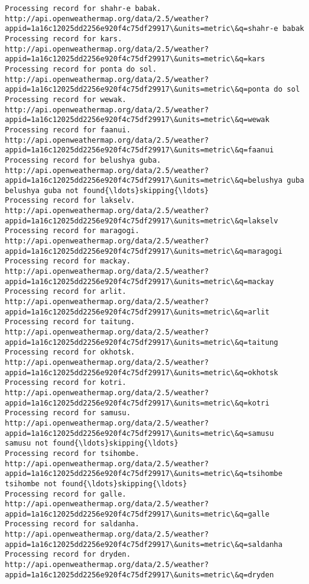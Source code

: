 \documentclass[11pt]{article}
\begin{document}
\begin{Verbatim}[commandchars=\\\{\}]
Processing record for shahr-e babak.
http://api.openweathermap.org/data/2.5/weather?appid=1a16c12025dd2256e920f4c75df29917\&units=metric\&q=shahr-e babak
Processing record for kars.
http://api.openweathermap.org/data/2.5/weather?appid=1a16c12025dd2256e920f4c75df29917\&units=metric\&q=kars
Processing record for ponta do sol.
http://api.openweathermap.org/data/2.5/weather?appid=1a16c12025dd2256e920f4c75df29917\&units=metric\&q=ponta do sol
Processing record for wewak.
http://api.openweathermap.org/data/2.5/weather?appid=1a16c12025dd2256e920f4c75df29917\&units=metric\&q=wewak
Processing record for faanui.
http://api.openweathermap.org/data/2.5/weather?appid=1a16c12025dd2256e920f4c75df29917\&units=metric\&q=faanui
Processing record for belushya guba.
http://api.openweathermap.org/data/2.5/weather?appid=1a16c12025dd2256e920f4c75df29917\&units=metric\&q=belushya guba
belushya guba not found{\ldots}skipping{\ldots}
Processing record for lakselv.
http://api.openweathermap.org/data/2.5/weather?appid=1a16c12025dd2256e920f4c75df29917\&units=metric\&q=lakselv
Processing record for maragogi.
http://api.openweathermap.org/data/2.5/weather?appid=1a16c12025dd2256e920f4c75df29917\&units=metric\&q=maragogi
Processing record for mackay.
http://api.openweathermap.org/data/2.5/weather?appid=1a16c12025dd2256e920f4c75df29917\&units=metric\&q=mackay
Processing record for arlit.
http://api.openweathermap.org/data/2.5/weather?appid=1a16c12025dd2256e920f4c75df29917\&units=metric\&q=arlit
Processing record for taitung.
http://api.openweathermap.org/data/2.5/weather?appid=1a16c12025dd2256e920f4c75df29917\&units=metric\&q=taitung
Processing record for okhotsk.
http://api.openweathermap.org/data/2.5/weather?appid=1a16c12025dd2256e920f4c75df29917\&units=metric\&q=okhotsk
Processing record for kotri.
http://api.openweathermap.org/data/2.5/weather?appid=1a16c12025dd2256e920f4c75df29917\&units=metric\&q=kotri
Processing record for samusu.
http://api.openweathermap.org/data/2.5/weather?appid=1a16c12025dd2256e920f4c75df29917\&units=metric\&q=samusu
samusu not found{\ldots}skipping{\ldots}
Processing record for tsihombe.
http://api.openweathermap.org/data/2.5/weather?appid=1a16c12025dd2256e920f4c75df29917\&units=metric\&q=tsihombe
tsihombe not found{\ldots}skipping{\ldots}
Processing record for galle.
http://api.openweathermap.org/data/2.5/weather?appid=1a16c12025dd2256e920f4c75df29917\&units=metric\&q=galle
Processing record for saldanha.
http://api.openweathermap.org/data/2.5/weather?appid=1a16c12025dd2256e920f4c75df29917\&units=metric\&q=saldanha
Processing record for dryden.
http://api.openweathermap.org/data/2.5/weather?appid=1a16c12025dd2256e920f4c75df29917\&units=metric\&q=dryden

\end{Verbatim}
\end{document}
